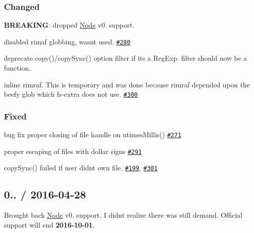 \subsubsection*{Changed}


\begin{DoxyItemize}
\item {\bfseries B\+R\+E\+A\+K\+I\+NG}\+: dropped \mbox{\hyperlink{classNode}{Node}} v0. support.
\item disabled {\ttfamily rimaf} globbing, wasn\textquotesingle{}t used. \href{https://github.com/jprichardson/node-fs-extra/pull/280}{\tt \#280}
\item deprecate {\ttfamily copy()/copy\+Sync()} option {\ttfamily filter} if it\textquotesingle{}s a {\ttfamily Reg\+Exp}. {\ttfamily filter} should now be a function.
\item inline {\ttfamily rimraf}. This is temporary and was done because {\ttfamily rimraf} depended upon the beefy {\ttfamily glob} which {\ttfamily fs-\/extra} does not use. \href{https://github.com/jprichardson/node-fs-extra/pull/300}{\tt \#300}
\end{DoxyItemize}

\subsubsection*{Fixed}


\begin{DoxyItemize}
\item bug fix proper closing of file handle on {\ttfamily utimes\+Millis()} \href{https://github.com/jprichardson/node-fs-extra/issues/271}{\tt \#271}
\item proper escaping of files with dollar signs \href{https://github.com/jprichardson/node-fs-extra/pull/291}{\tt \#291}
\item {\ttfamily copy\+Sync()} failed if user didn\textquotesingle{}t own file. \href{https://github.com/jprichardson/node-fs-extra/issues/199}{\tt \#199}, \href{https://github.com/jprichardson/node-fs-extra/pull/301}{\tt \#301}
\end{DoxyItemize}

\subsection*{0.. / 2016-\/04-\/28 }


\begin{DoxyItemize}
\item Brought back \mbox{\hyperlink{classNode}{Node}} v0. support. I didn\textquotesingle{}t realize there was still demand. Official support will end {\bfseries 2016-\/10-\/01}.
\end{DoxyItemize}

